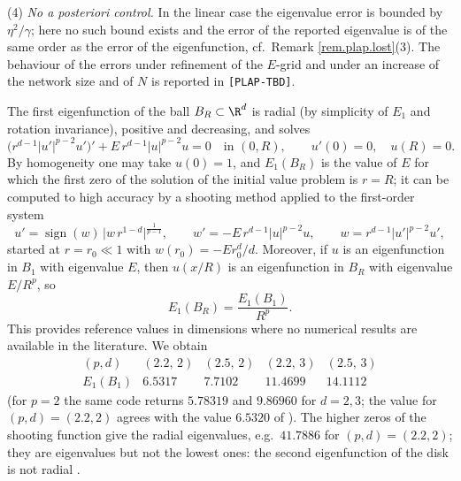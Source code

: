 \begin{remark}
(4) \emph{No a posteriori control.} In the linear case the eigenvalue error is bounded by
$\eta^2/\gamma$; here no such bound exists and the error of the reported eigenvalue is of
the same order as the error of the eigenfunction, cf.\ Remark \ref{rem.plap.lost}(3).
The behaviour of the errors under refinement of the $E$-grid and under an increase of the
network size and of $N$ is reported in \texttt{[PLAP-TBD]}.
\end{remark}

\begin{remark}\label{rem.radial}
The first eigenfunction of the ball $B_R\subset\R^d$ is radial (by simplicity of $E_1$
and rotation invariance), positive and decreasing, and solves
\begin{equation}\label{radial.ode}
\big(r^{d-1}|u'|^{p-2}u'\big)'+E\,r^{d-1}|u|^{p-2}u=0\quad\text{in }(0,R),\qquad u'(0)=0,\quad u(R)=0 .
\end{equation}
By homogeneity one may take $u(0)=1$, and $E_1(B_R)$ is the value of $E$ for which the
first zero of the solution of the initial value problem is $r=R$; it can be computed to
high accuracy by a shooting method applied to the first-order system
\[
u'=\operatorname{sign}(w)\,\big|w\,r^{1-d}\big|^{\frac1{p-1}},\qquad
w'=-E\,r^{d-1}|u|^{p-2}u,\qquad w=r^{d-1}|u'|^{p-2}u',
\]
started at $r=r_0\ll1$ with $w(r_0)=-Er_0^d/d$. Moreover, if $u$ is an eigenfunction in
$B_1$ with eigenvalue $E$, then $u(x/R)$ is an eigenfunction in $B_R$ with eigenvalue
$E/R^p$, so
\[
E_1(B_R)=\frac{E_1(B_1)}{R^p}.
\]
This provides reference values in dimensions where no numerical results are available
in the literature. We obtain
\[
\begin{array}{c|cccc}
(p,d) & (2.2,\,2) & (2.5,\,2) & (2.2,\,3) & (2.5,\,3)\\\hline
E_1(B_1) & 6.5317 & 7.7102 & 11.4699 & 14.1112
\end{array}
\]
(for $p=2$ the same code returns $5.78319$ and $9.86960$ for $d=2,3$; the value for
$(p,d)=(2.2,2)$ agrees with the value $6.5320$ of \cite{HJ11}). The higher zeros of the
shooting function give the radial eigenvalues, e.g.\ $41.7886$ for $(p,d)=(2.2,2)$; they
are eigenvalues but not the lowest ones: the second eigenfunction of the disk is not
radial \cite{Benedikt-Drabek-Girg}.
\end{remark}


